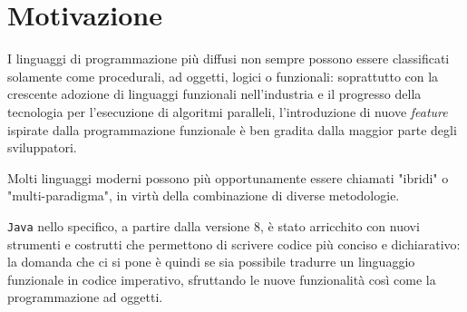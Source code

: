 \section{Motivazione}
\label{sec:1-1-motivation}

I linguaggi di programmazione più diffusi non sempre possono essere classificati
solamente come procedurali, ad oggetti, logici o funzionali: soprattutto con la crescente adozione di linguaggi funzionali
nell'industria e il progresso della tecnologia per l'esecuzione di algoritmi paralleli, l'introduzione di nuove \textit{feature}
ispirate dalla programmazione funzionale è ben gradita dalla maggior parte degli sviluppatori.

\noindent Molti linguaggi moderni possono più opportunamente essere chiamati "ibridi" o "multi-paradigma",
in virtù della combinazione di diverse metodologie.


\texttt{Java} nello specifico, a partire dalla versione 8, è stato arricchito con nuovi strumenti e costrutti
che permettono di scrivere codice più conciso e dichiarativo: la domanda che ci si pone è quindi se sia possibile tradurre
un linguaggio funzionale in codice imperativo, sfruttando le nuove funzionalità così come la programmazione ad oggetti.